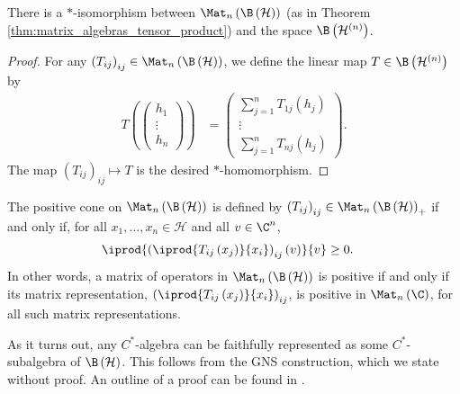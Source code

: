 \begin{theorem}
  There is a $\ast$-isomorphism between $\Mat_n\left( \B\left( \mathcal{H} \right) \right)$ (as in Theorem \ref{thm:matrix_algebras_tensor_product}) and the space $\B\left( \mathcal{H}^{(n)} \right)$.
\end{theorem}
\begin{proof}
  For any $\left( T_{ij} \right)_{ij}\in \Mat_n\left( \B\left( \mathcal{H} \right) \right)$, we define the linear map $T\in \B\left( \mathcal{H}^{(n)} \right)$ by
  \begin{align*}
    T\left( \begin{pmatrix}h_1\\\vdots\\h_n\end{pmatrix} \right) &= \begin{pmatrix}\sum_{j=1}^{n}T_{1j}\left( h_j \right) \\ \vdots \\ \sum_{j=1}^{n}T_{nj}\left( h_j \right)\end{pmatrix}.
  \end{align*}
  The map $\left( T_{ij} \right)_{ij} \mapsto T$ is the desired $\ast$-homomorphism.
\end{proof}
\begin{remark}
  The positive cone on $\Mat_n\left( \B\left( \mathcal{H} \right) \right)$ is defined by $\left( T_{ij} \right)_{ij}\in \Mat_n\left( \B\left( \mathcal{H} \right) \right)_{+}$ if and only if, for all $x_1,\dots,x_n\in \mathcal{H}$ and all $v\in \C^n$,
  \begin{align*}
    \iprod{\left( \iprod{T_{ij}\left( x_j \right)}{x_i} \right)_{ij} \left( v \right)}{v} &\geq 0.
  \end{align*}
  In other words, a matrix of operators in $\Mat_n\left( \B\left( \mathcal{H} \right) \right)$ is positive if and only if its matrix representation, $\left( \iprod{T_{ij}\left( x_j \right)}{x_i} \right)_{ij}$, is positive in $\Mat_n\left( \C \right)$, for all such matrix representations.
\end{remark}
As it turns out, any $C^{\ast}$-algebra can be faithfully represented as some $C^{\ast}$-subalgebra of $\B\left( \mathcal{H} \right)$. This follows from the GNS construction, which we state without proof. An outline of a proof can be found in \cite[Section II.6.4]{blackadar_operator_algebras}.
